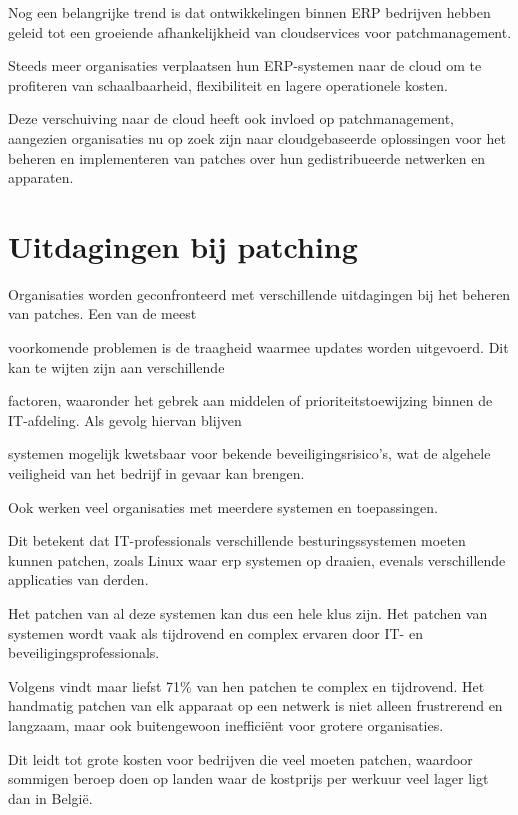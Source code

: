 Nog een belangrijke trend is dat ontwikkelingen binnen ERP bedrijven hebben geleid tot een groeiende afhankelijkheid van cloudservices voor patchmanagement.

Steeds meer organisaties verplaatsen hun ERP-systemen naar de cloud om te profiteren van schaalbaarheid, flexibiliteit en lagere operationele kosten.

Deze verschuiving naar de cloud heeft ook invloed op patchmanagement, aangezien organisaties nu op zoek zijn naar cloudgebaseerde oplossingen voor het beheren en implementeren van patches over hun gedistribueerde netwerken en apparaten. \autocite{Kannan2023}

\section{Uitdagingen bij patching}
Organisaties worden geconfronteerd met verschillende uitdagingen bij het beheren van patches. Een van de meest

voorkomende problemen is de traagheid waarmee updates worden uitgevoerd. Dit kan te wijten zijn aan verschillende

factoren, waaronder het gebrek aan middelen of prioriteitstoewijzing binnen de IT-afdeling. Als gevolg hiervan blijven

systemen mogelijk kwetsbaar voor bekende beveiligingsrisico's, wat de algehele veiligheid van het bedrijf in gevaar kan brengen. \autocite{AppMaster2023}

Ook werken veel organisaties met meerdere systemen en toepassingen.

Dit betekent dat IT-professionals verschillende besturingssystemen moeten kunnen patchen, zoals Linux waar erp systemen op draaien, evenals verschillende applicaties van derden.

Het patchen van al deze systemen kan dus een hele klus zijn. Het patchen van systemen wordt vaak als tijdrovend en complex ervaren door IT- en beveiligingsprofessionals.

Volgens \textcite{ivanti2021} vindt maar liefst 71\% van hen patchen te complex en tijdrovend. Het handmatig patchen van elk apparaat op een netwerk is niet alleen frustrerend en langzaam, maar ook buitengewoon inefficiënt voor grotere organisaties.

Dit leidt tot grote kosten voor bedrijven die veel moeten patchen, waardoor sommigen beroep doen op landen waar de kostprijs per werkuur veel lager ligt dan in België. \autocite{Munck2024}

